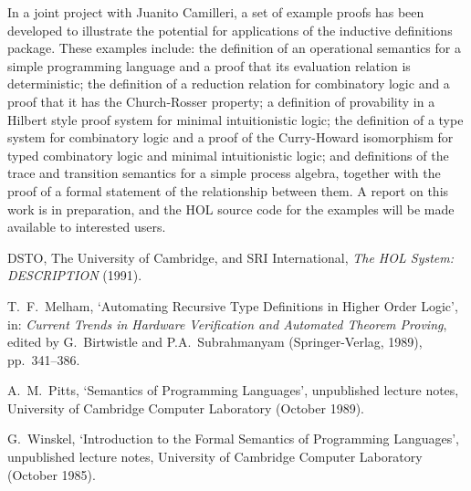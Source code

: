 \documentclass[twocolumn,fleqn,layout]{article}
\begin{document}
In a joint project with Juanito Camilleri, a set of example proofs has
been developed to illustrate the potential for applications of the inductive
\mbox{definitions} package.  These examples include: the definition of an
operational semantics for a simple programming language and a proof that its
evaluation relation is \mbox{deterministic}; the definition of a reduction
relation for combinatory logic and a proof that it has the Church-Rosser
property; a definition of \mbox{provability} in a Hilbert style proof system
for minimal intuitionistic logic; the definition of a type system for
combinatory logic and a proof of the Curry-Howard isomorphism for typed
combinatory logic and minimal intuitionistic logic; and definitions of the
trace and transition semantics for a simple process algebra, \mbox{together}
with the proof of a formal statement of the relationship between them. A report
on this work is in preparation, and the {\small HOL} source code for the
examples will be made available to interested users.

\newpage

\begin{thebibliography}{9}

DSTO, The University of Cambridge, and SRI
\mbox{International}, {\it The HOL System: DESCRIPTION} (1991).

T.\ F.\ Melham, `Automating Recursive Type Definitions
in Higher Order Logic',
in: {\it Current Trends in Hardware Verification and
Automated Theorem Proving\/}, edited by G.\ Birtwistle
and P.A.\ Subrahmanyam
(Springer-Verlag, 1989), pp.\ 341--386.

A.\ M.\ Pitts, `Semantics of Programming Languages',
unpublished lecture notes, University of Cambridge Computer Laboratory
(October 1989).

G.\ Winskel, `Introduction to the Formal Semantics of
Programming Languages', unpublished lecture notes, University of Cambridge
Computer Laboratory (October 1985).

\end{thebibliography}
\end{document}

